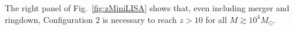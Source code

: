 \documentclass{iopart}
\newcommand{\beq}{\begin{equation}}
\newcommand{\eeq}{\end{equation}}
\newcommand{\f}[2]{\frac{#1}{#2}}
\def\beq{\begin{eqnarray}}
\def\eeq{\end{eqnarray}}
\def\f{\frac}
\def\Qlm{Q_{lmn}}
\begin{document}
The right panel of Fig.~\ref{fig:zMiniLISA} shows that, even including merger
and ringdown, Configuration 2 is necessary to reach $z>10$ for all $M\gtrsim
10^4 M_\odot$.



\end{document}
